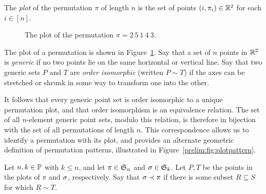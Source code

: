     \begin{definition} \label{prelim:def:permplot}
      The \emph{plot} of the permutation $\pi$ of length $n$ is
      the set of points $(i, \pi_i) \in \bR^2$ for each $i \in [n]$. 
    \end{definition}

    \begin{figure}[t]\centering 
      \caption{The plot of the permutation $\pi = 2\ 5\ 1\ 4\ 3$.}
      \label{prelim:fig:plot}
    \end{figure}

    The plot of a permutation is shown in Figure~\ref{prelim:fig:plot}. 
    Say that a set of $n$ points in $\bR^2$ is \emph{generic} if no two points
    lie on the same horizontal or vertical line. 
    Say that two generic sets $P$ and $T$ are \emph{order isomorphic} (written
    $P \sim T$) if the axes can be stretched or shrunk in some way to transform
    one into the other. 
    
    It follows that every generic point set is order isomorphic to
    a unique permutation plot, and that order isomorphism is an equivalence
    relation.
    The set of all $n$-element generic point sets, modulo this relation, is
    therefore in bijection with the set of all permutations of length $n$. This
    correspondence allows us to identify a permutation with its plot, and
    provides an alternate geometric definition of permutation patterns,
    illustrated in Figure~\ref{prelim:fig:plotpattern}.

    \begin{definition} 
      Let $n,k \in \Pos$ with $k \leq n$, and let $\pi \in \S_n$ and $\sg \in
      \S_k$. Let $P, T$ be the points in the plots of $\pi$ and $\sg$,
      respectively. Say that $\sg \prec \pi$ if there is some subset $R
      \subseteq S$ for which $R \sim T$. 
    \end{definition}


